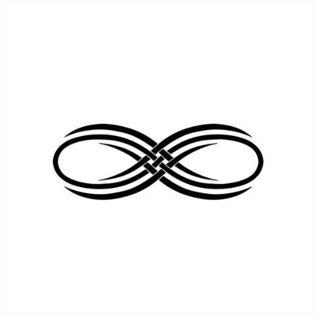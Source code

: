 \documentclass{article}
\begin{document}
\begin{center}
\includegraphics[scale=00.20]{infini}
\end{center}

\newpage
\thispagestyle{empty}
\tableofcontents

\newpage
\fontsize{12}{12}
\end{document}
